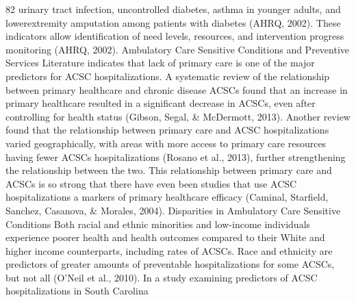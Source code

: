 \documentclass[../main.tex]{subfiles}
\begin{document}
82 urinary tract infection, uncontrolled diabetes, asthma in younger adults, and lowerextremity amputation among patients with diabetes (AHRQ, 2002). These indicators allow identification of need levels, resources, and intervention progress monitoring (AHRQ, 2002). Ambulatory Care Sensitive Conditions and Preventive Services Literature indicates that lack of primary care is one of the major predictors for ACSC hospitalizations. A systematic review of the relationship between primary healthcare and chronic disease ACSCs found that an increase in primary healthcare resulted in a significant decrease in ACSCs, even after controlling for health status (Gibson, Segal, & McDermott, 2013). Another review found that the relationship between primary care and ACSC hospitalizations varied geographically, with areas with more access to primary care resources having fewer ACSCs hospitalizations (Rosano et al., 2013), further strengthening the relationship between the two. This relationship between primary care and ACSCs is so strong that there have even been studies that use ACSC hospitalizations a markers of primary healthcare efficacy (Caminal, Starfield, Sanchez, Casanova, & Morales, 2004). Disparities in Ambulatory Care Sensitive Conditions Both racial and ethnic minorities and low-income individuals experience poorer health and health outcomes compared to their White and higher income counterparts, including rates of ACSCs. Race and ethnicity are predictors of greater amounts of preventable hospitalizations for some ACSCs, but not all (O'Neil et al., 2010). In a study examining predictors of ACSC hospitalizations in South Carolina
\end{document}
